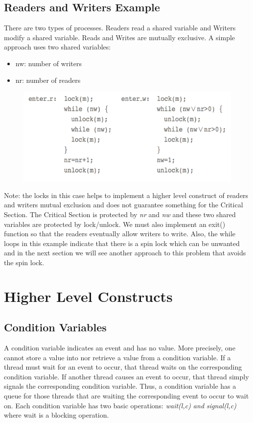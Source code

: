 \documentclass{hw}
\begin{document}
\subsection{Readers and Writers Example}
There are two types of processes. Readers read a shared variable and Writers 
modify a shared variable. Reads and Writes are mutually exclusive. A simple 
approach uses two shared variables:
\begin{itemize}
  \item nw: number of writers
  \item nr: number of readers
\end{itemize}

\begin{figure}[H]
  \centering
  \includegraphics[scale=.6]{readwrite}
\end{figure}

Note: the locks in this case helps to implement a higher level construct of readers
and writers mutual exclusion and does not guarantee something for the Critical 
Section. The Critical Section is protected by \emph{nr} and \emph{nw} and these
two shared variables are protected by lock/unlock. We must also implement an exit()
function so that the readers eventually allow writers to write. Also, the while
loops in this example indicate that there is a spin lock which can be unwanted
and in the next section we will see another approach to this problem that avoids
the spin lock.


\section{Higher Level Constructs}
\subsection{Condition Variables}
A condition variable indicates an event and has no value. More precisely, one 
cannot store a value into nor retrieve a value from a condition variable. If a 
thread must wait for an event to occur, that thread waits on the corresponding 
condition variable. If another thread causes an event to occur, that thread 
simply signals the corresponding condition variable. Thus, a condition variable 
has a queue for those threads that are waiting the corresponding event to occur 
to wait on. Each condition variable has two basic operations: \emph{wait(l,c) and
signal(l,c)} where wait is a blocking operation.
\end{document}
